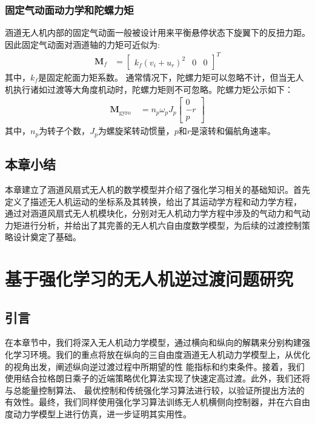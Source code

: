 \subsection{固定气动面动力学和陀螺力矩}
涵道无人机内部的固定气动面一般被设计用来平衡悬停状态下旋翼下的反扭力距。因此固定气动面对涵道轴的力矩可近似为:
\begin{align}
    \mathbf{M}_{f} & = \left[\begin{array}{lll}
    k_{f} (v_{i}+u_{r})^{2} & 0 & 0 
    \end{array}\right]^{T}
\end{align}
其中，$k_{f}$是固定舵面力矩系数。
通常情况下，陀螺力矩可以忽略不计，但当无人机执行诸如过渡等大角度机动时，陀螺力矩则不可忽略。陀螺力矩公示如下：
\begin{align}
    \mathbf{M}_{\text {gyro }} & = n_{p} \omega_{p} J_{p}\left[\begin{array}{c}
    0 \\
    -r \\
    p
    \end{array}\right]
\end{align}
其中，$n_{p}$为转子个数，$J_{p}$为螺旋桨转动惯量，$p$和$r$是滚转和偏航角速率。

\section{本章小结}
本章建立了涵道风扇式无人机的数学模型并介绍了强化学习相关的基础知识。首先定义了描述无人机运动的坐标系及其转换，给出了其运动学方程和动力学方程，
通过对涵道风扇式无人机模块化，分别对无人机动力学方程中涉及的气动力和气动力矩进行分析，并给出了其完善的无人机六自由度数学模型，为后续的过渡控制策略设计奠定了基础。
\chapter{基于强化学习的无人机逆过渡问题研究}
\section{引言}
在本章节中，我们将深入无人机动力学模型，通过横向和纵向的解耦来分别构建强化学习环境。我们的重点将放在纵向的三自由度涵道无人机动力学模型上，从优化的视角出发，阐述纵向逆过渡过程中所期望的性
能指标和约束条件。接着，我们使用结合拉格朗日乘子的近端策略优化算法实现了快速定高过渡。此外，我们还将与总能量控制算法、
最优控制和传统强化学习算法进行较，以验证所提出方法的有效性。最终，我们同样使用强化学习算法训练无人机横侧向控制器，并在六自由度动力学模型上进行仿真，进一步证明其实用性。
